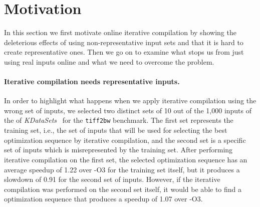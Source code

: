\section{Motivation \label{sec:motivation}}


    In this section we first motivate online iterative compilation by showing the deleterious effects of using non-representative input
    sets and that it is hard to create representative ones. Then we go on to examine what stops us from just using real inputs online and
    what we need to overcome the problem.

    \paragraph{Iterative compilation needs representative inputs.} 
    In order to highlight what happens when we apply iterative compilation using the wrong set of inputs, we selected two distinct sets of
    10 out of the 1,000 inputs of the of \textit{KDataSets}~\cite{chen10,chen12a} for the \texttt{tiff2bw} benchmark.
    The first set represents the training set, i.e., the set of inputs that will be used for selecting the best optimization sequence by
    iterative compilation, and the second set is a specific set of inputs which is misrepresented by the training set.
    After performing iterative compilation on the first set, the selected optimization sequence has an average speedup of 1.22 over -O3 for
    the training set itself, but it produces a slowdown of 0.91 for the second set of inputs.
    However, if the iterative compilation was performed on the second set itself, it would be able to find a optimization sequence that
    produces a speedup of 1.07 over -O3.


